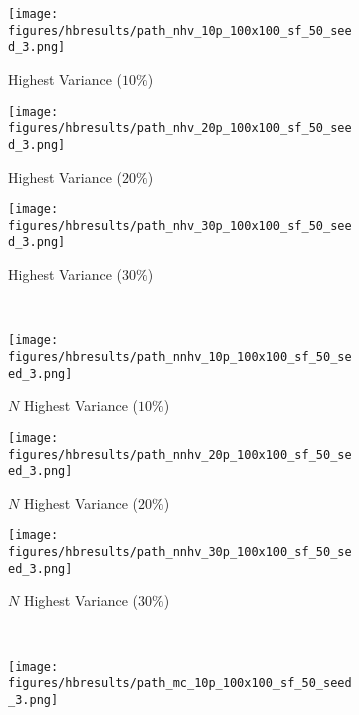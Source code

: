 \begin{figure}[htb!]
    \centering
        \begin{subfigure}[t]{0.32\textwidth}
        \centering
        \texttt{[image: figures/hbresults/path\_nhv\_10p\_100x100\_sf\_50\_seed\_3.png]}
        \ssp
        \captionsetup{skip=0.20\baselineskip,size=footnotesize}
        \caption{Highest Variance ($10\%$)}
    \end{subfigure}%
    \begin{subfigure}[t]{0.32\textwidth}
        \centering
        \texttt{[image: figures/hbresults/path\_nhv\_20p\_100x100\_sf\_50\_seed\_3.png]}
        \ssp
        \captionsetup{skip=0.20\baselineskip,size=footnotesize}
        \caption{Highest Variance ($20\%$)}
    \end{subfigure}%
    \begin{subfigure}[t]{0.32\textwidth}
        \centering
        \texttt{[image: figures/hbresults/path\_nhv\_30p\_100x100\_sf\_50\_seed\_3.png]}
        \ssp
        \captionsetup{skip=0.20\baselineskip,size=footnotesize}
        \caption{Highest Variance ($30\%$)}
    \end{subfigure}%
    \\
    \begin{subfigure}[t]{0.32\textwidth}
        \centering
        \texttt{[image: figures/hbresults/path\_nnhv\_10p\_100x100\_sf\_50\_seed\_3.png]}
        \ssp
        \captionsetup{skip=0.20\baselineskip,size=footnotesize}
        \caption{$N$ Highest Variance ($10\%$)}
    \end{subfigure}%
    \begin{subfigure}[t]{0.32\textwidth}
        \centering
        \texttt{[image: figures/hbresults/path\_nnhv\_20p\_100x100\_sf\_50\_seed\_3.png]}
        \ssp
        \captionsetup{skip=0.20\baselineskip,size=footnotesize}
        \caption{$N$ Highest Variance ($20\%$)}
    \end{subfigure}%
    \begin{subfigure}[t]{0.32\textwidth}
        \centering
        \texttt{[image: figures/hbresults/path\_nnhv\_30p\_100x100\_sf\_50\_seed\_3.png]}
        \ssp
        \captionsetup{skip=0.20\baselineskip,size=footnotesize}
        \caption{$N$ Highest Variance ($30\%$)}
    \end{subfigure}%
    \\
    \begin{subfigure}[t]{0.32\textwidth}
        \centering
        \texttt{[image: figures/hbresults/path\_mc\_10p\_100x100\_sf\_50\_seed\_3.png]}

\end{subfigure}
\end{figure}
